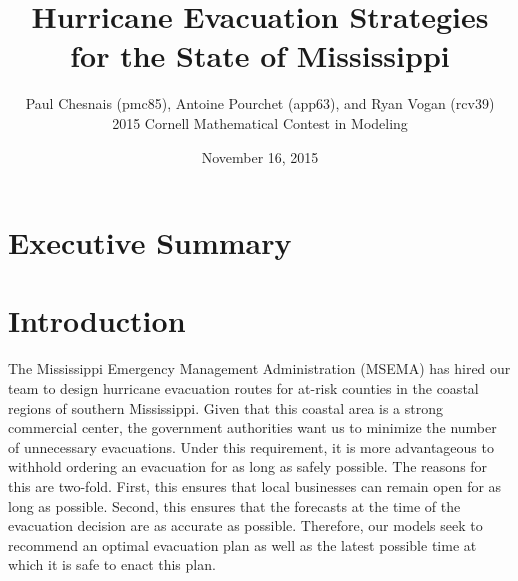 \documentclass[titlepage]{article}
\title{Hurricane Evacuation Strategies for the State of Mississippi}
\author{Paul Chesnais (pmc85), Antoine Pourchet (app63), and Ryan Vogan (rcv39)\\2015 Cornell Mathematical Contest in Modeling}
\date{November 16, 2015}
\begin{document}
\maketitle
\thispagestyle{empty}

\section{Executive Summary}
\label{sec:summary}

\section{Introduction}
\label{sec:introduction}
  The Mississippi Emergency Management Administration (MSEMA) has hired our team to design hurricane evacuation routes for at-risk counties in the coastal regions of southern Mississippi. Given that this coastal area is a strong commercial center, the government authorities want us to minimize the number of unnecessary evacuations. Under this requirement, it is more advantageous to withhold ordering an evacuation for as long as safely possible. The reasons for this are two-fold. First, this ensures that local businesses can remain open for as long as possible. Second, this ensures that the forecasts at the time of the evacuation decision are as accurate as possible. Therefore, our models seek to recommend an optimal evacuation plan as well as the latest possible time at which it is safe to enact this plan.
\end{document}
